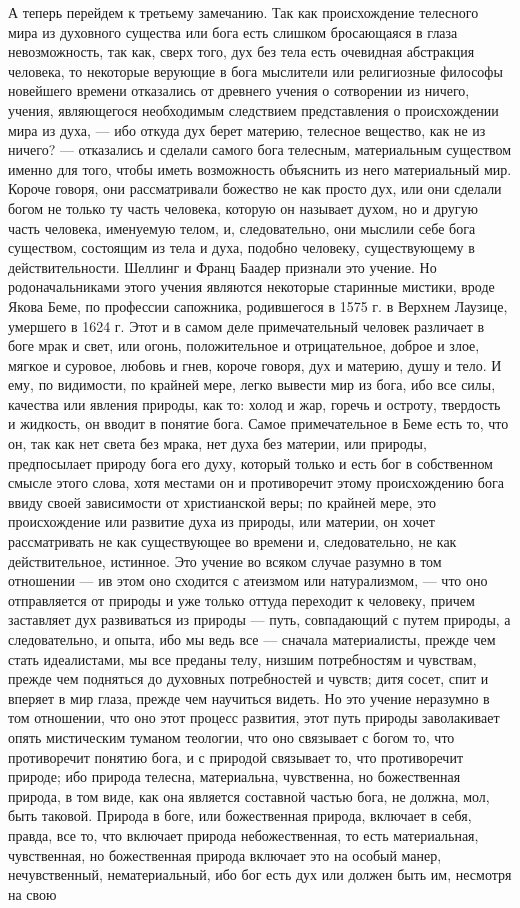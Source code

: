 \documentclass[12pt]{article}
\begin{document}
А теперь перейдем к третьему замечанию. Так как происхождение телесного мира из духовного существа или бога есть слишком бросающаяся в глаза невозможность, так как, сверх того, дух без тела есть очевидная абстракция человека, то некоторые верующие в бога мыслители или религиозные философы новейшего времени отказались от древнего учения о сотворении из ничего, учения, являющегося необходимым следствием представления о происхождении мира из духа, --- ибо откуда дух берет материю, телесное вещество, как не из ничего? --- отказались и сделали самого бога телесным, материальным существом именно для того, чтобы иметь возможность объяснить из него материальный мир. Короче говоря, они рассматривали божество не как просто дух, или они сделали богом не только ту часть человека, которую он называет духом, но и другую часть человека, именуемую телом, и, следовательно, они мыслили себе бога существом, состоящим из тела и духа, подобно человеку, существующему в действительности. Шеллинг и Франц Баадер признали это учение. Но родоначальниками этого учения являются некоторые старинные мистики, вроде Якова Беме, по профессии сапожника, родившегося в 1575 г. в Верхнем Лаузице, умершего в 1624 г. Этот и в самом деле примечательный человек различает в боге мрак и свет, или огонь, положительное и отрицательное, доброе и злое, мягкое и суровое, любовь и гнев, короче говоря, дух и материю, душу и тело. И ему, по видимости, по крайней мере, легко вывести мир из бога, ибо все силы, качества или явления природы, как то: холод и жар, горечь и остроту, твердость и жидкость, он вводит в понятие бога. Самое примечательное в Беме есть то, что он, так как нет света без мрака, нет духа без материи, или природы, предпосылает природу бога его духу, который только и есть бог в собственном смысле этого слова, хотя местами он и противоречит этому происхождению бога ввиду своей зависимости от христианской веры; по крайней мере, это происхождение или развитие духа из природы, или материи, он хочет рассматривать не как существующее во времени и, следовательно, не как действительное, истинное. Это учение во всяком случае разумно в том отношении --- ив этом оно сходится с атеизмом или натурализмом, --- что оно отправляется от природы и уже только оттуда переходит к человеку, причем заставляет дух развиваться из природы --- путь, совпадающий с путем природы, а следовательно, и опыта, ибо мы ведь все --- сначала материалисты, прежде чем стать идеалистами, мы все преданы телу, низшим потребностям и чувствам, прежде чем подняться до духовных потребностей и чувств; дитя сосет, спит и вперяет в мир глаза, прежде чем научиться видеть. Но это учение неразумно в том отношении, что оно этот процесс развития, этот путь природы заволакивает опять мистическим туманом теологии, что оно связывает с богом то, что противоречит понятию бога, и с природой связывает то, что противоречит природе; ибо природа телесна, материальна, чувственна, но божественная природа, в том виде, как она является составной частью бога, не должна, мол, быть таковой. Природа в боге, или божественная природа, включает в себя, правда, все то, что включает природа небожественная, то есть материальная, чувственная, но божественная природа включает это на особый манер, нечувственный, нематериальный, ибо бог есть дух или должен быть им, несмотря на свою 
\end{document}
